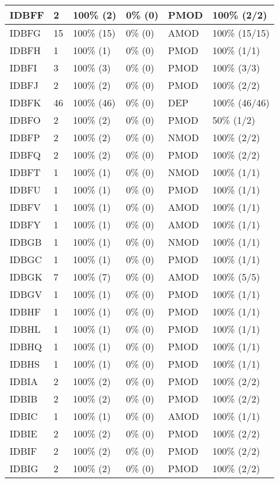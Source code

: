 \begin{figure*}
\begin{tabular}{|l|l|l|l||l|l|}
\hline
 IDBFF & 2 & 100\% (2) & 0\% (0) & PMOD & 100\% (2/2) \\ 
\hline
 IDBFG & 15 & 100\% (15) & 0\% (0) & AMOD & 100\% (15/15) \\ 
\hline
 IDBFH & 1 & 100\% (1) & 0\% (0) & PMOD & 100\% (1/1) \\ 
\hline
 IDBFI & 3 & 100\% (3) & 0\% (0) & PMOD & 100\% (3/3) \\ 
\hline
 IDBFJ & 2 & 100\% (2) & 0\% (0) & PMOD & 100\% (2/2) \\ 
\hline
 IDBFK & 46 & 100\% (46) & 0\% (0) & DEP & 100\% (46/46) \\ 
\hline
 IDBFO & 2 & 100\% (2) & 0\% (0) & PMOD & 50\% (1/2) \\ 
\hline
 IDBFP & 2 & 100\% (2) & 0\% (0) & NMOD & 100\% (2/2) \\ 
\hline
 IDBFQ & 2 & 100\% (2) & 0\% (0) & PMOD & 100\% (2/2) \\ 
\hline
 IDBFT & 1 & 100\% (1) & 0\% (0) & NMOD & 100\% (1/1) \\ 
\hline
 IDBFU & 1 & 100\% (1) & 0\% (0) & PMOD & 100\% (1/1) \\ 
\hline
 IDBFV & 1 & 100\% (1) & 0\% (0) & AMOD & 100\% (1/1) \\ 
\hline
 IDBFY & 1 & 100\% (1) & 0\% (0) & AMOD & 100\% (1/1) \\ 
\hline
 IDBGB & 1 & 100\% (1) & 0\% (0) & NMOD & 100\% (1/1) \\ 
\hline
 IDBGC & 1 & 100\% (1) & 0\% (0) & PMOD & 100\% (1/1) \\ 
\hline
 IDBGK & 7 & 100\% (7) & 0\% (0) & AMOD & 100\% (5/5) \\ 
\hline
 IDBGV & 1 & 100\% (1) & 0\% (0) & PMOD & 100\% (1/1) \\ 
\hline
 IDBHF & 1 & 100\% (1) & 0\% (0) & PMOD & 100\% (1/1) \\ 
\hline
 IDBHL & 1 & 100\% (1) & 0\% (0) & PMOD & 100\% (1/1) \\ 
\hline
 IDBHQ & 1 & 100\% (1) & 0\% (0) & PMOD & 100\% (1/1) \\ 
\hline
 IDBHS & 1 & 100\% (1) & 0\% (0) & PMOD & 100\% (1/1) \\ 
\hline
 IDBIA & 2 & 100\% (2) & 0\% (0) & PMOD & 100\% (2/2) \\ 
\hline
 IDBIB & 2 & 100\% (2) & 0\% (0) & PMOD & 100\% (2/2) \\ 
\hline
 IDBIC & 1 & 100\% (1) & 0\% (0) & AMOD & 100\% (1/1) \\ 
\hline
 IDBIE & 2 & 100\% (2) & 0\% (0) & PMOD & 100\% (2/2) \\ 
\hline
 IDBIF & 2 & 100\% (2) & 0\% (0) & PMOD & 100\% (2/2) \\ 
\hline
 IDBIG & 2 & 100\% (2) & 0\% (0) & PMOD & 100\% (2/2) \\ 
\hline
\end{tabular}
\end{figure*}
